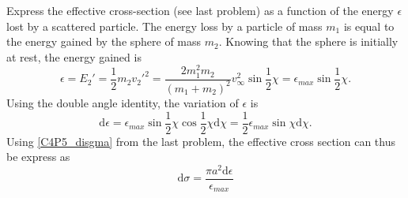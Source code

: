 \begin{problem}
{
Express the effective cross-section (see last problem) as a function of the energy $\epsilon$ lost by a scattered particle.
}
{
The energy loss by a particle of mass $m_1$ is equal to the energy gained by the sphere of mass $m_2$. Knowing that the sphere is initially at rest, the energy gained is
\begin{equation*}
    \epsilon = E_2' = \frac{1}{2} m_2 v_2'^2 = \frac{2 m_1^2 m_2}{\left( m_1+m_2 \right)^2} v_\infty^2\sin{\frac{1}{2}\chi} = \epsilon_{max} \sin{\frac{1}{2}\chi}.
\end{equation*}
Using the double angle identity, the variation of $\epsilon$ is
\begin{equation*}
    \mathrm{d}\epsilon = \epsilon_{max}\sin{\frac{1}{2}\chi}\cos{\frac{1}{2}\chi}\mathrm{d}\chi = \frac{1}{2}\epsilon_{max}\sin{\chi}\mathrm{d}\chi.
\end{equation*}
Using \eqref{C4P5_disgma} from the last problem, the effective cross section can thus be express as
}
{
\begin{equation*}
    \mathrm{d}\sigma = \frac{\pi a^2 \mathrm{d}\epsilon}{\epsilon_{max}}
\end{equation*}
}
\end{problem}


